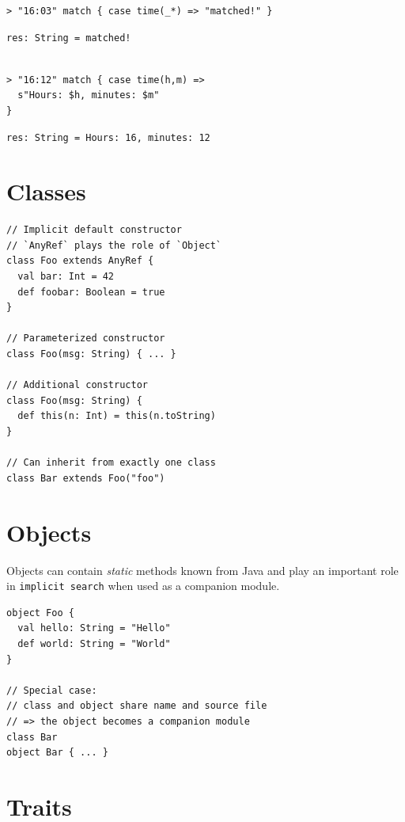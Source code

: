 \documentclass[10pt,landscape,a4paper]{article}
\begin{document}
\begin{multicols*}{4}
\begin{verbatim}
> "16:03" match { case time(_*) => "matched!" }
\end{verbatim}
\begin{verbatim}
res: String = matched!
\end{verbatim}

\begin{verbatim}

> "16:12" match { case time(h,m) =>
  s"Hours: $h, minutes: $m"
}
\end{verbatim}
\begin{verbatim}
res: String = Hours: 16, minutes: 12
\end{verbatim}


  \section{Classes}

\begin{verbatim}
// Implicit default constructor
// `AnyRef` plays the role of `Object`
class Foo extends AnyRef {
  val bar: Int = 42
  def foobar: Boolean = true
}

// Parameterized constructor
class Foo(msg: String) { ... }

// Additional constructor
class Foo(msg: String) {
  def this(n: Int) = this(n.toString)
}

// Can inherit from exactly one class
class Bar extends Foo("foo")
\end{verbatim}

  \section{Objects}

  \begin{mdframed}
    Objects can contain \textit{static} methods known from Java and
    play an important role in \texttt{implicit search} when used as a
    companion module.
  \end{mdframed}

\begin{verbatim}
object Foo {
  val hello: String = "Hello"
  def world: String = "World"
}

// Special case:
// class and object share name and source file
// => the object becomes a companion module
class Bar
object Bar { ... }
\end{verbatim}

  \section{Traits}


\end{multicols*}
\end{document}
